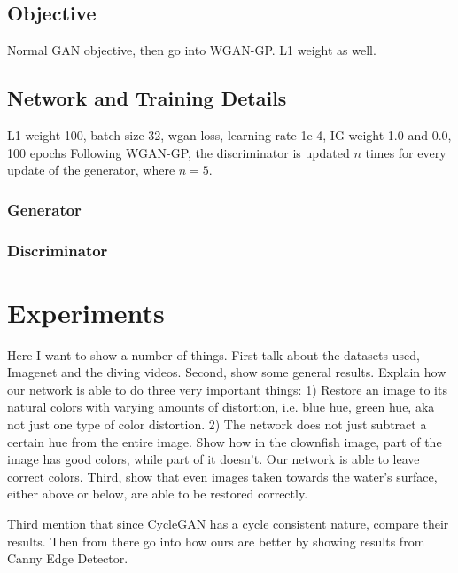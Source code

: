 \documentclass[conference]{IEEEtran}
\begin{document}
\subsection{Objective}
Normal GAN objective, then go into WGAN-GP. L1 weight as well.

\subsection{Network and Training Details}

L1 weight 100, batch size 32, wgan loss, learning rate 1e-4, IG weight 1.0 and 0.0, 100 epochs
Following WGAN-GP, the discriminator is updated $n$ times for every update of the generator, where $n = 5$.

\subsubsection{Generator}



\subsubsection{Discriminator}


\section{Experiments}

Here I want to show a number of things. First talk about the datasets used, Imagenet and the diving videos.
Second, show some general results. Explain how our network is able to do three very important things: 1) Restore an
image to its natural colors with varying amounts of distortion, i.e. blue hue, green hue, aka not just one type of
color distortion. 2) The network does not just subtract a certain hue from the entire image. Show how in the clownfish
image, part of the image has good colors, while part of it doesn't. Our network is able to leave correct colors. Third,
show that even images taken towards the water's surface, either above or below, are able to be restored correctly.

Third mention that since CycleGAN has a cycle consistent nature, compare their results. Then from there go into how
ours are better by showing results from Canny Edge Detector.
\end{document}
